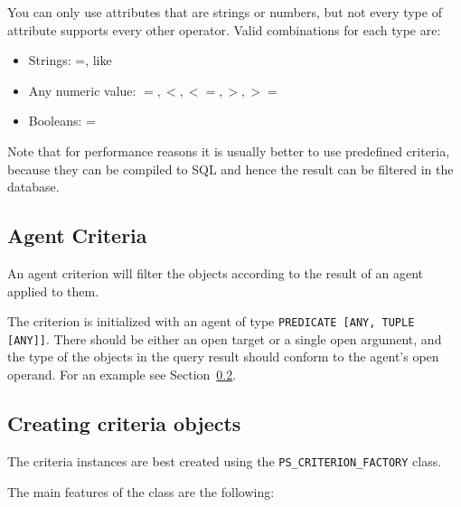 \documentclass[a4paper,12pt]{report}
\begin{document}
You can only use attributes that are strings or numbers, but not every type of attribute supports every other operator. Valid combinations for each type are:

 \begin{itemize}
  \item Strings: =, like
  \item Any numeric value: $=, <, <=, >, >=$
  \item Booleans: =
 \end{itemize}

Note that for performance reasons it is usually better to use predefined criteria, because they can be compiled to SQL and hence the result can be filtered in the database.

\subsection{Agent Criteria}

An agent criterion will filter the objects according to the result of an agent applied to them.

The criterion is initialized with an agent of type \lstinline!PREDICATE [ANY, TUPLE [ANY]]!. 
There should be either an open target or a single open argument, and the type of the objects in the query result should conform to the agent's open operand. 
For an example see Section~\ref{sec:creating_criteria_objects}.

\subsection{Creating criteria objects}
\label{sec:creating_criteria_objects}
The criteria instances are best created using the \lstinline!PS_CRITERION_FACTORY! class.

The main features of the class are the following: 
\end{document}
